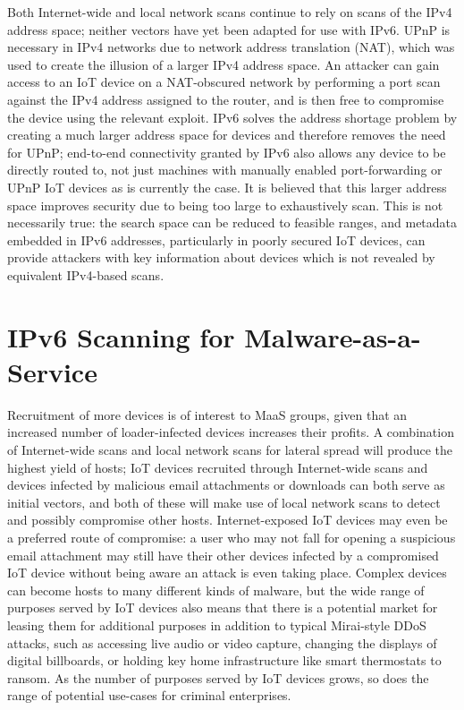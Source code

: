 \documentclass[10pt,sigconf]{acmart}
\begin{document}
Both Internet-wide and local network scans continue to rely on scans of the IPv4 address space;
neither vectors have yet been adapted for use with IPv6.
UPnP is necessary in IPv4 networks due to network address translation (NAT), which was used to create the illusion of a larger IPv4 address space.
An attacker can gain access to an IoT device on a NAT-obscured network by performing a port scan against the IPv4 address assigned to the router, and is then free to compromise the device using the relevant exploit.
IPv6 solves the address shortage problem by creating a much larger address space for devices and therefore removes the need for UPnP;
end-to-end connectivity granted by IPv6 also allows any device to be directly routed to, not just machines with manually enabled port-forwarding or UPnP IoT devices as is currently the case.
It is believed that this larger address space improves security due to being too large to exhaustively scan.
This is not necessarily true:
the search space can be reduced to feasible ranges, and metadata embedded in IPv6 addresses, particularly in poorly secured IoT devices, can provide attackers with key information about devices which is not revealed by equivalent IPv4-based scans.

\section{IPv6 Scanning for Malware-as-a-Service}

Recruitment of more devices is of interest to MaaS groups, given that an increased number of loader-infected devices increases their profits.
A combination of Internet-wide scans and local network scans for lateral spread will produce the highest yield of hosts;
IoT devices recruited through Internet-wide scans and devices infected by malicious email attachments or downloads can both serve as initial vectors, and both of these will make use of local network scans to detect and possibly compromise other hosts.
Internet-exposed IoT devices may even be a preferred route of compromise:
a user who may not fall for opening a suspicious email attachment may still have their other devices infected by a compromised IoT device without being aware an attack is even taking place.
Complex devices can become hosts to many different kinds of malware, but the wide range of purposes served by IoT devices also means that there is a potential market for leasing them for additional purposes in addition to typical Mirai-style DDoS attacks, such as accessing live audio or video capture, changing the displays of digital billboards, or holding key home infrastructure like smart thermostats to ransom.
As the number of purposes served by IoT devices grows, so does the range of potential use-cases for criminal enterprises.
\end{document}
